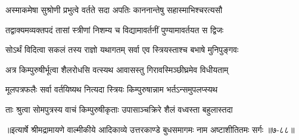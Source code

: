 \twolineshloka
{अस्माकमेषा सुश्रोणी प्रभुत्वे वर्तते सदा}
{अपतिः काननान्तेषु सहास्माभिश्चरत्यसौ} %

\twolineshloka
{तद्वाक्यमव्यक्तपदं तासां स्त्रीणां निशम्य च}
{विद्यामावर्तनीं पुण्यामावर्तयत स द्विजः} %

\twolineshloka
{सोऽर्थं विदित्वा सकलं तस्य राज्ञो यथागतम्}
{सर्वा एव स्त्रियस्ताश्च बभाषे मुनिपुङ्गवः} %

\twolineshloka
{अत्र किम्पुरुषीर्भूत्वा शैलरोधसि वत्स्यथ}
{आवासस्तु गिरावस्मिञ्छीघ्रमेव विधीयताम्} %

\twolineshloka
{मूलपत्रफलैः सर्वा वर्तयिष्यथ नित्यदा}
{स्त्रियः किम्पुरुषान्नाम भर्तऽन्समुपलप्स्यथ} %

\twolineshloka
{ताः श्रुत्वा सोमपुत्रस्य वाचं किम्पुरुषीकृताः}
{उपासाञ्चक्रिरे शैलं वध्वस्ता बहुलास्तदा} %


॥इत्यार्षे श्रीमद्रामायणे वाल्मीकीये आदिकाव्ये उत्तरकाण्डे बुधसमागमः नाम अष्टाशीतितमः सर्गः ॥७-८८॥
